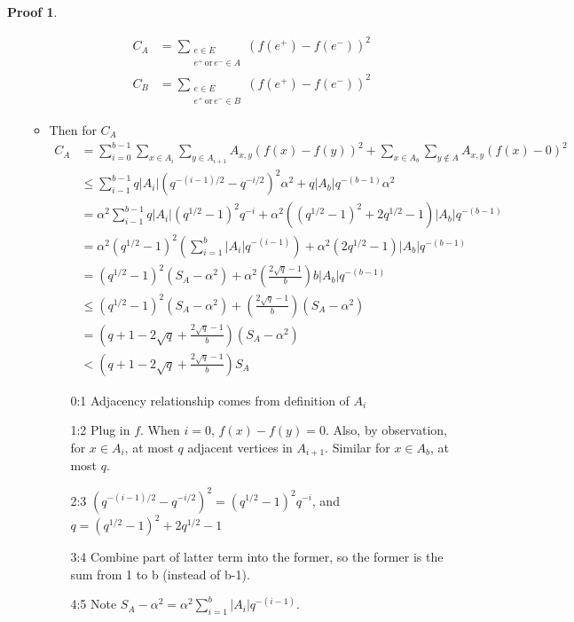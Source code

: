 \documentclass{book}
\newcommand{\abs}[1]{\lvert #1 \rvert }
\theoremstyle{definition}
\theoremstyle{remarkstyle}
\newtheorem*{myproof}{Proof}%
\begin{document}
\begin{myproof}
\begin{itemize}
\begin{itemize}
\begin{align*}
                C_{A} &= \sum_{\substack{e\in E \\ e^{+} \, \textrm{or} \, e^{-} \in A }}(f(e^{+}) - f(e^{-}))^{2} \\
                C_{B} &= \sum_{\substack{e\in E \\ e^{+} \, \textrm{or} \, e^{-} \in B }}(f(e^{+}) - f(e^{-}))^{2}
            \end{align*}
            \item Then for $C_{A}$ 
            \begin{align*}
                C_{A} &= \sum^{b-1}_{i=0}\sum_{x\in A_{i}}\sum_{y\in A_{i+1}}A_{x,y}(f(x)-f(y))^{2} + \sum_{x\in A_{b}}\sum_{y\notin A}A_{x,y}(f(x)-0)^{2} \\
                &\le \sum^{b-1}_{i-1}q\abs{A_{i}}(q^{-(i-1)/2}-q^{-i/2})^{2}\alpha^{2} + q\abs{A_{b}}q^{-(b-1)}\alpha^{2} \\ 
                &= \alpha^{2}\sum^{b-1}_{i-1}q\abs{A_{i}}(q^{1/2}-1)^{2}q^{-i} + \alpha^{2}((q^{1/2}-1)^{2}+2q^{1/2}-1)\abs{A_{b}}q^{-(b-1)} \\
                &= \alpha^{2}(q^{1/2}-1)^{2}(\sum^{b}_{i=1}\abs{A_{i}}q^{-(i-1)}) + \alpha^{2}(2q^{1/2}-1)\abs{A_{b}}q^{-(b-1)} \\
                &= (q^{1/2}-1)^{2}(S_{A}-\alpha^{2}) + \alpha^{2}(\frac{2\sqrt{q}-1}{b}) b \abs{A_{b}} q^{-(b-1)} \\ 
                &\le (q^{1/2}-1)^{2}(S_{A}-\alpha^{2}) + (\frac{2\sqrt{q}-1}{b})(S_{A}-\alpha^{2}) \\
                &= (q+1-2\sqrt{q}+\frac{2\sqrt{q}-1}{b})(S_{A}-\alpha^{2}) \\
                &< (q+1-2\sqrt{q}+\frac{2\sqrt{q}-1}{b})S_{A}
            \end{align*}
            \begin{itemize}
                \item[0:1] Adjacency relationship comes from definition of $A_{i}$
                \item[1:2] Plug in $f$. When $i=0$, $f(x)-f(y)=0$. Also, by observation, for $x \in A_{i}$, at most $q$ adjacent vertices in $A_{i+1} $. Similar for $x \in A_{b} $, at most $q$. 
                \item[2:3] $(q^{-(i-1)/2}-q^{-i/2})^{2} = (q^{1/2}-1)^{2}q^{-i}$, and $q = (q^{1/2}-1)^{2}+2q^{1/2}-1 $ 
                \item[3:4] Combine part of latter term into the former, so the former is the sum from 1 to b (instead of b-1). 
                \item[4:5] Note $S_{A} -\alpha^{2} = \alpha^{2}\sum^{b}_{i=1}\abs{A_{i}}q^{-(i-1)} $.

\end{itemize}
\end{itemize}
\end{itemize}
\end{myproof}
\end{document}
